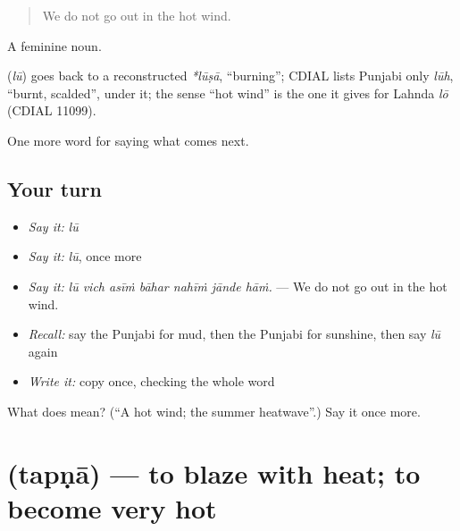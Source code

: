\begin{quote}
We do not go out in the hot wind.
\end{quote}

A feminine noun.

\begin{cousinweb}
\textbf{} (\emph{lū}) goes back to a reconstructed \emph{*lūṣā}, \textquotedblleft{}burning\textquotedblright{}; CDIAL lists Punjabi only \emph{lūh}, \textquotedblleft{}burnt, scalded\textquotedblright{}, under it; the sense \textquotedblleft{}hot wind\textquotedblright{} is the one it gives for Lahnda \emph{lō} (CDIAL 11099).
\end{cousinweb}

\begin{grammarlens}[title={What you've built}]
One more word for saying what comes next.
\end{grammarlens}

\subsection*{Your turn}
\begin{itemize}
\raggedright
  \item \emph{Say it:} \emph{lū}
  \item \emph{Say it:} \emph{lū}, once more
  \item \emph{Say it:} \emph{lū vich asīṁ bāhar nahīṁ jānde hāṁ.} — We do not go out in the hot wind.
  \item \emph{Recall:} say the Punjabi for mud, then the Punjabi for sunshine, then say \emph{lū} again
  \item \emph{Write it:} copy \textbf{} once, checking the whole word
\end{itemize}

\begin{tcolorbox}[breakable,colback=teal!4,colframe=teal!35!black,title={Before you move on}]
What does  mean? (\textquotedblleft{}A hot wind; the summer heatwave\textquotedblright{}.) Say it once more.
\end{tcolorbox}
\section[\texorpdfstring{\pa{ਤਪਣਾ} (tapṇā)}{ਤਪਣਾ (tapṇā)}]{ (tapṇā) — to blaze with heat; to become very hot}

\label{lesson:PA-C288-tapna}



